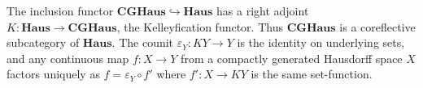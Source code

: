 The inclusion functor $\mathbf{CGHaus} \hookrightarrow \mathbf{Haus}$ has a right adjoint $K: \mathbf{Haus} \to \mathbf{CGHaus}$, the Kelleyfication functor. Thus $\mathbf{CGHaus}$ is a coreflective subcategory of $\mathbf{Haus}$. The counit $\varepsilon_Y: KY \to Y$ is the identity on underlying sets, and any continuous map $f: X \to Y$ from a compactly generated Hausdorff space $X$ factors uniquely as $f = \varepsilon_Y \circ f'$ where $f': X \to KY$ is the same set-function.
